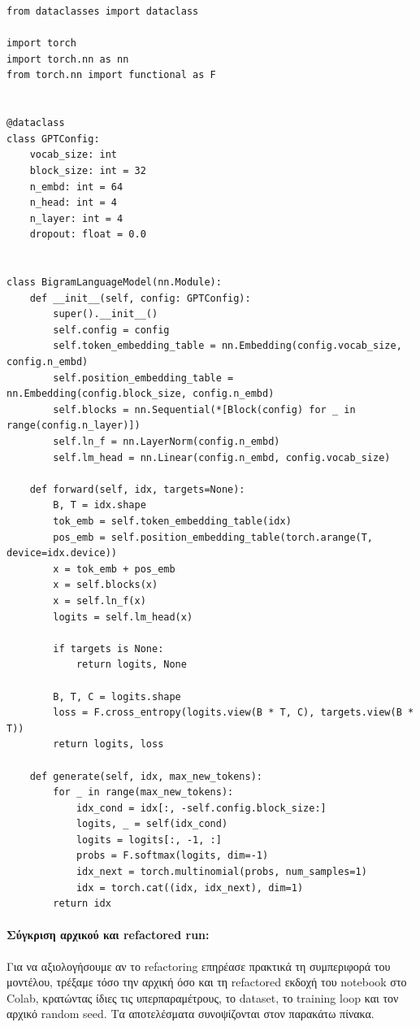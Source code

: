 \documentclass[11pt,a4paper]{article}
\begin{document}
\begin{lstlisting}[caption={Refactored configuration and model skeleton}]
from dataclasses import dataclass

import torch
import torch.nn as nn
from torch.nn import functional as F


@dataclass
class GPTConfig:
    vocab_size: int
    block_size: int = 32
    n_embd: int = 64
    n_head: int = 4
    n_layer: int = 4
    dropout: float = 0.0


class BigramLanguageModel(nn.Module):
    def __init__(self, config: GPTConfig):
        super().__init__()
        self.config = config
        self.token_embedding_table = nn.Embedding(config.vocab_size, config.n_embd)
        self.position_embedding_table = nn.Embedding(config.block_size, config.n_embd)
        self.blocks = nn.Sequential(*[Block(config) for _ in range(config.n_layer)])
        self.ln_f = nn.LayerNorm(config.n_embd)
        self.lm_head = nn.Linear(config.n_embd, config.vocab_size)

    def forward(self, idx, targets=None):
        B, T = idx.shape
        tok_emb = self.token_embedding_table(idx)
        pos_emb = self.position_embedding_table(torch.arange(T, device=idx.device))
        x = tok_emb + pos_emb
        x = self.blocks(x)
        x = self.ln_f(x)
        logits = self.lm_head(x)

        if targets is None:
            return logits, None

        B, T, C = logits.shape
        loss = F.cross_entropy(logits.view(B * T, C), targets.view(B * T))
        return logits, loss

    def generate(self, idx, max_new_tokens):
        for _ in range(max_new_tokens):
            idx_cond = idx[:, -self.config.block_size:]
            logits, _ = self(idx_cond)
            logits = logits[:, -1, :]
            probs = F.softmax(logits, dim=-1)
            idx_next = torch.multinomial(probs, num_samples=1)
            idx = torch.cat((idx, idx_next), dim=1)
        return idx
\end{lstlisting}

\paragraph{Σύγκριση αρχικού και \textlatin{refactored} run:}

Για να αξιολογήσουμε αν το \textlatin{refactoring} επηρέασε πρακτικά τη συμπεριφορά του μοντέλου,
τρέξαμε τόσο την αρχική όσο και τη \textlatin{refactored} εκδοχή του notebook στο \textlatin{Colab},
κρατώντας ίδιες τις υπερπαραμέτρους, το \textlatin{dataset}, το \textlatin{training loop} και τον αρχικό
\textlatin{random seed}. Τα αποτελέσματα συνοψίζονται στον παρακάτω πίνακα.
\end{document}
